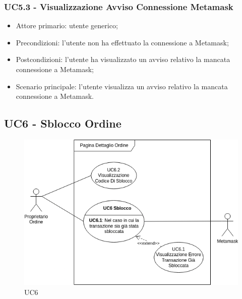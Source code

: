 \subsubsection{UC5.3 - Visualizzazione Avviso Connessione Metamask}

\begin{itemize}
    \item Attore primario: utente generico;
    \item Precondizioni: l'utente non ha effettuato la connessione a Metamask\glo{};
    \item Postcondizioni: l'utente ha visualizzato un avviso relativo la mancata connessione a Metamask\glo{};
    \item Scenario principale: l'utente visualizza un avviso relativo la mancata connessione a Metamask\glo{}.
\end{itemize}

\subsection{UC6 - Sblocco Ordine}\label{subsection: U6}

\begin{figure}[H]
    \centering
    \includegraphics[scale=0.7]{immagini/UC6.png}
    \caption{UC6}
\end{figure}

